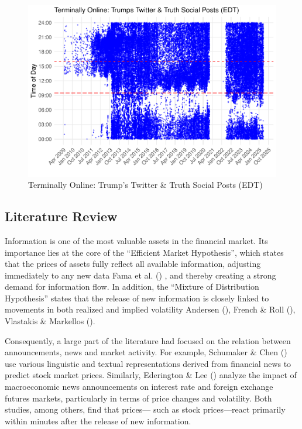 \documentclass[
]{article}
\begin{document}
\begin{figure}
\centering
\includegraphics{trump_volatility_2025_files/figure-latex/fig1-1.pdf}
\caption{\label{fig:fig1}Terminally Online: Trump's Twitter \& Truth Social Posts (EDT)}
\end{figure}

\subsection{Literature Review}\label{literature-review}

Information is one of the most valuable assets in the financial market.
Its importance lies at the core of the ``Efficient Market Hypothesis'',
which states that the prices of assets fully reflect all
available information, adjusting immediately to any new data
Fama et al. () , and thereby creating a strong demand
for information flow. In addition, the ``Mixture of Distribution
Hypothesis'' states that the release of new information is closely linked
to movements in both realized and implied volatility
Andersen (), French \& Roll (),
Vlastakis \& Markellos ().

Consequently, a large part of the literature had focused on the relation
between announcements, news and market activity. For example,
Schumaker \& Chen () use various linguistic and textual
representations derived from financial news to predict stock market
prices. Similarly, Ederington \& Lee () analyze the impact
of macroeconomic news announcements on interest rate and foreign
exchange futures markets, particularly in terms of price changes and
volatility. Both studies, among others, find that prices--- such as stock
prices---react primarily within minutes after the release of new
information.
\end{document}
